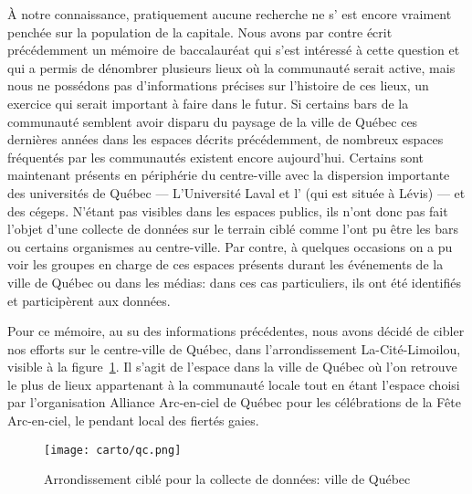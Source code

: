 À notre connaissance, pratiquement aucune recherche ne s’ est encore vraiment penchée sur la population \lgbt{} de la capitale. 
Nous avons par contre écrit précédemment un mémoire de baccalauréat qui s'est intéressé à cette question et qui a permis de dénombrer plusieurs lieux où la communauté serait active, mais nous ne possédons pas d'informations précises sur l'histoire de ces lieux, un exercice qui serait important à faire dans le futur. 
Si certains bars de la communauté semblent avoir disparu du paysage de la ville de Québec ces dernières années dans les espaces décrits précédemment, de nombreux espaces fréquentés par les communautés \lgbt{} existent encore aujourd'hui. 
Certains sont maintenant présents en périphérie du centre-ville avec la dispersion importante des universités de Québec --- L'Université Laval et l'\uqar{} (qui est située à Lévis) --- et des cégeps. 
N'étant pas visibles dans les espaces publics, ils n'ont donc pas fait l'objet d'une collecte de données sur le terrain ciblé comme l'ont pu être les bars ou certains organismes au centre-ville.
Par contre, à quelques occasions on a pu voir les groupes en charge de ces espaces présents durant les événements \lgbt{} de la ville de Québec ou dans les médias: dans ces cas particuliers, ils ont été identifiés et participèrent aux données.

Pour ce mémoire, au su des informations précédentes, nous avons décidé de cibler nos efforts sur le centre-ville de Québec, dans l'arrondissement La-Cité-Limoilou, visible à la figure~\ref{fig:espaces_quebec}. 
Il s'agit de l'espace dans la ville de Québec où l'on retrouve le plus de lieux appartenant à la communauté \lgbt{} locale tout en étant l'espace choisi par l'organisation Alliance Arc-en-ciel de Québec pour les célébrations de la Fête Arc-en-ciel, le pendant local des fiertés gaies.

\label{ssub:la_ville_de_quebec}
\begin{figure}[ht]
	\centering
	\texttt{[image: carto/qc.png]}
	\caption{Arrondissement ciblé pour la collecte de données: ville de Québec}\label{fig:espaces_quebec}
\end{figure}


